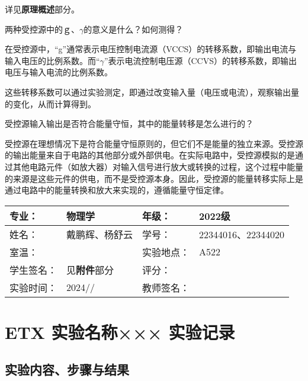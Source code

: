 \documentclass[dvipsnames, svgnames,a4paper,11pt]{article}
\begin{document}
	详见\textbf{原理概述}部分。
	
	\begin{question}
		两种受控源中的ｇ、$\gamma$的意义是什么？如何测得？
	\end{question}
	在受控源中，“g”通常表示电压控制电流源（VCCS）的转移系数，即输出电流与输入电压的比例系数。而“$\gamma$”表示电流控制电压源（CCVS）的转移系数，即输出电压与输入电流的比例系数。
	
	这些转移系数可以通过实验测定，即通过改变输入量（电压或电流），观察输出量的变化，从而计算得到。
	
	\begin{question}
		受控源输入输出是否符合能量守恒，其中的能量转移是怎么进行的？
	\end{question}
	受控源在理想情况下是符合能量守恒原则的，但它们不是能量的独立来源。受控源的输出能量来自于电路的其他部分或外部供电。在实际电路中，受控源模拟的是通过其他电路元件（如放大器）对输入信号进行放大或转换的过程，这个过程中能量的来源是这些元件的供电，而不是受控源本身。因此，受控源的能量转移实际上是通过电路中的能量转换和放大来实现的，遵循能量守恒定律。
	
	
	
	
	\clearpage
	
	\begin{table}
		\renewcommand\arraystretch{1.7}
		\centering
		\begin{tabularx}{\textwidth}{|X|X|X|X|}
			\hline
			专业： & 物理学 & 年级： & 2022级 \\
			\hline
			姓名： & 戴鹏辉、杨舒云 & 学号： & 22344016、22344020\\
			\hline
			室温： &  & 实验地点： & A522 \\
			\hline
			学生签名：& 见\textbf{附件}部分 & 评分： &\\
			\hline
			实验时间：& 2024// & 教师签名：&\\
			\hline
		\end{tabularx}
	\end{table}
	
	\section{ETX 实验名称×××  \quad\heiti 实验记录}
	
	\subsection{实验内容、步骤与结果}
	
\end{document}
